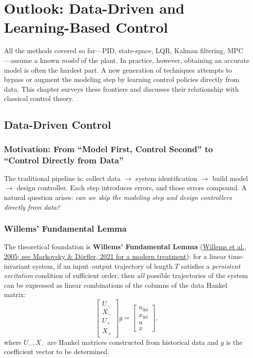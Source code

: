\section{Outlook: Data-Driven and Learning-Based Control}

All the methods covered so far---PID, state-space, LQR, Kalman filtering, MPC---assume a known \emph{model} of the plant. In practice, however, obtaining an accurate model is often the hardest part. A new generation of techniques attempts to bypass or augment the modeling step by learning control policies directly from data. This chapter surveys these frontiers and discusses their relationship with classical control theory.

\subsection{Data-Driven Control}

\subsubsection{Motivation: From ``Model First, Control Second'' to ``Control Directly from Data''}

The traditional pipeline is: collect data $\to$ system identification $\to$ build model $\to$ design controller. Each step introduces errors, and those errors compound. A natural question arises: \emph{can we skip the modeling step and design controllers directly from data?}

\subsubsection{Willems' Fundamental Lemma}

The theoretical foundation is \textbf{Willems' Fundamental Lemma} (\href{https://arxiv.org/abs/2206.00397}{Willems et al., 2005; see Markovsky \& Dörfler, 2021 for a modern treatment}): for a linear time-invariant system, if an input--output trajectory of length $T$ satisfies a \emph{persistent excitation} condition of sufficient order, then \emph{all} possible trajectories of the system can be expressed as linear combinations of the columns of the data Hankel matrix:
\[
\begin{bmatrix} U_- \\ X_- \\ U_+ \\ X_+ \end{bmatrix} g = \begin{bmatrix} u_{\mathrm{ini}} \\ x_{\mathrm{ini}} \\ u \\ x \end{bmatrix},
\]
where $U_-, X_-$ are Hankel matrices constructed from historical data and $g$ is the coefficient vector to be determined.

